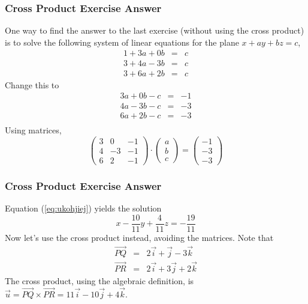 \documentclass[xcolor=dvipsnames]{beamer}
\begin{document}
\begin{frame}
  \frametitle{Cross Product Exercise Answer}
One way to find the answer to the last exercise (without using the
cross product) is to solve the following system of linear equations
for the plane $x+ay+bz=c$,
\begin{equation}
  \label{eq:yohghaef}
  \begin{array}{rcl}
    1+3a+0b&=&c \\
    3+4a-3b&=&c \\
    3+6a+2b&=&c
  \end{array}
\end{equation}
Change this to
\begin{equation}
  \label{eq:oxeingiu}
  \begin{array}{rcl}
    3a+0b-c&=&-1 \\
    4a-3b-c&=&-3 \\
    6a+2b-c&=&-3 \\
  \end{array}
\end{equation}
Using matrices,
\begin{equation}
  \label{eq:ukohjiej}
  \left(
    \begin{array}{ccc}
      3&0&-1 \\
      4&-3&-1 \\
      6&2&-1
    \end{array}\right)\cdot\left(
    \begin{array}{c}
      a \\
      b \\
      c
    \end{array}\right)=\left(
    \begin{array}{c}
      -1 \\
      -3 \\
      -3
    \end{array}\right)
\end{equation}
\end{frame}

\begin{frame}
  \frametitle{Cross Product Exercise Answer}
  Equation (\ref{eq:ukohjiej}) yields the solution
  \begin{equation}
    \label{eq:maeshael}
      x-\frac{10}{11}y+\frac{4}{11}z=-\frac{19}{11}
  \end{equation}
Now let's use the cross product instead, avoiding the matrices. Note
that
\begin{equation}
  \label{eq:ushahroh}
  \begin{array}{rcl}
    \vec{PQ}&=&2\vec{i}+\vec{j}-3\vec{k} \\
    \vec{PR}&=&2\vec{i}+3\vec{j}+2\vec{k}
  \end{array}
\end{equation}
The cross product, using the algebraic definition, is
$\vec{u}=\vec{PQ}\times\vec{PR}=11\vec{i}-10\vec{j}+4\vec{k}$.
\end{frame}
\end{document}
